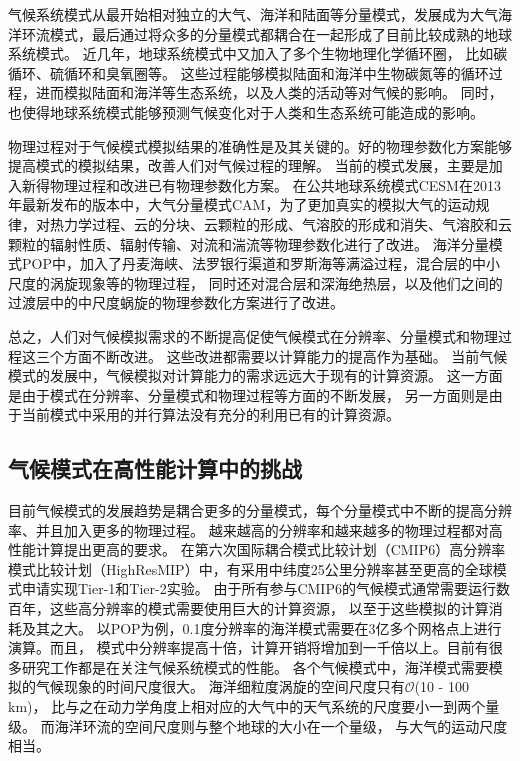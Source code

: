 气候系统模式从最开始相对独立的大气、海洋和陆面等分量模式，发展成为大气海洋环流模式，最后通过将众多的分量模式都耦合在一起形成了目前比较成熟的地球系统模式。
近几年，地球系统模式中又加入了多个生物地理化学循环圈， 比如碳循环、硫循环和臭氧圈等\cite{stocker2013ipcc}。
这些过程能够模拟陆面和海洋中生物碳氮等的循环过程，进而模拟陆面和海洋等生态系统，以及人类的活动等对气候的影响。
同时，也使得地球系统模式能够预测气候变化对于人类和生态系统可能造成的影响。

物理过程对于气候模式模拟结果的准确性是及其关键的。好的物理参数化方案能够提高模式的模拟结果，改善人们对气候过程的理解。 
当前的模式发展，主要是加入新得物理过程和改进已有物理参数化方案。 
在公共地球系统模式CESM在2013年最新发布的版本\cite{hurrell2013community}中，大气分量模式CAM，为了更加真实的模拟大气的运动规律，对热力学过程、云的分块、云颗粒的形成、气溶胶的形成和消失、气溶胶和云颗粒的辐射性质、辐射传输、对流和湍流等物理参数化进行了改进。
海洋分量模式POP中，加入了丹麦海峡、法罗银行渠道和罗斯海等满溢过程，混合层的中小尺度的涡旋现象等的物理过程， 同时还对混合层和深海绝热层，以及他们之间的过渡层中的中尺度蜗旋的物理参数化方案进行了改进。
 
总之，人们对气候模拟需求的不断提高促使气候模式在分辨率、分量模式和物理过程这三个方面不断改进。
这些改进都需要以计算能力的提高作为基础。
当前气候模式的发展中，气候模拟对计算能力的需求远远大于现有的计算资源。
这一方面是由于模式在分辨率、分量模式和物理过程等方面的不断发展，
另一方面则是由于当前模式中采用的并行算法没有充分的利用已有的计算资源。


\subsection{气候模式在高性能计算中的挑战}

目前气候模式的发展趋势是耦合更多的分量模式，每个分量模式中不断的提高分辨率、并且加入更多的物理过程\cite{stocker2013ipcc}。
越来越高的分辨率和越来越多的物理过程都对高性能计算提出更高的要求。 
在第六次国际耦合模式比较计划（CMIP6）高分辨率模式比较计划（HighResMIP）中，有采用中纬度25公里分辨率甚至更高的全球模式申请实现Tier-1和Tier-2实验。 
由于所有参与CMIP6的气候模式通常需要运行数百年，这些高分辨率的模式需要使用巨大的计算资源， 以至于这些模拟的计算消耗及其之大。
以POP为例，0.1度分辨率的海洋模式需要在3亿多个网格点上进行演算。而且，
模式中分辨率提高十倍，计算开销将增加到一千倍以上。目前有很多研究工作都是在关注气候系统模式的性能\cite{Worley:2011:PCE:2063384.2063457,dennis2012computational}。 
各个气候模式中，海洋模式需要模拟的气候现象的时间尺度很大。 
海洋细粒度涡旋的空间尺度只有$\mathcal{O}$(10 - 100 km)， 比与之在动力学角度上相对应的大气中的天气系统的尺度要小一到两个量级。
而海洋环流的空间尺度则与整个地球的大小在一个量级， 与大气的运动尺度相当。



